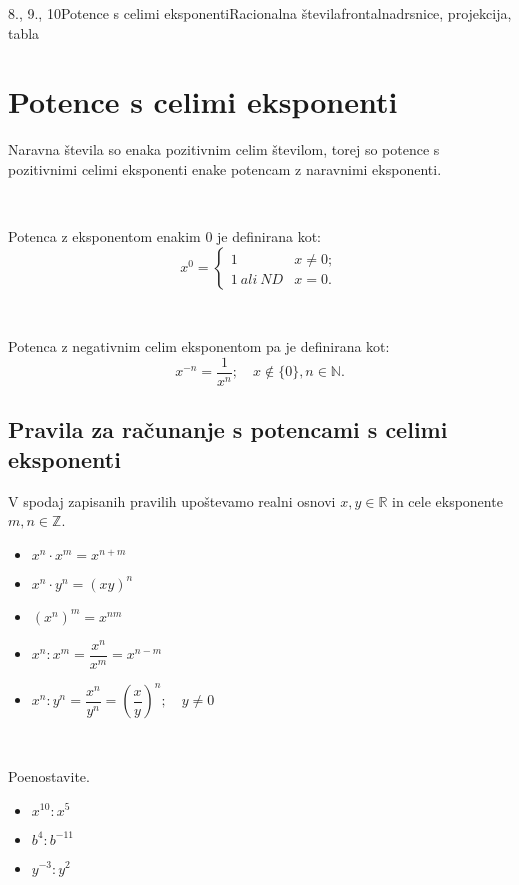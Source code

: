 \begin{priprava}{8., 9., 10}{}{Potence s celimi eksponenti}{Racionalna števila}{frontalna}{drsnice, projekcija, tabla}

    \section{Potence s celimi eksponenti}

            Naravna števila so enaka pozitivnim celim številom, torej so potence s pozitivnimi celimi eksponenti enake potencam z naravnimi eksponenti.

            ~

            Potenca z eksponentom enakim $0$ je definirana kot: 
            $$x^0=\begin{cases}
                    1 &x\neq 0; \\
                    1 ~ali~ND &x=0.
                \end{cases}$$

            ~

            Potenca z negativnim celim eksponentom pa je definirana kot:
            $$x^{-n}=\dfrac{1}{x^n}; \quad x\notin\{0\}, n\in\mathbb{N}.$$

            
        \subsection*{Pravila za računanje s potencami s celimi eksponenti}
            V spodaj zapisanih pravilih upoštevamo realni osnovi $x,y\in\mathbb{R}$ in cele eksponente $m,n\in\mathbb{Z}$.
            \begin{itemize}
                \item $x^n\cdot x^m=x^{n+m}$
                \item $x^n\cdot y^n=(xy)^n$
                \item $\left(x^n\right)^m=x^{nm}$
                \item $x^n:x^m=\dfrac{x^n}{x^m}=x^{n-m}$
                \item $x^n:y^n=\dfrac{x^n}{y^n}=\left(\dfrac{x}{y}\right)^n; \quad y\neq 0$
            \end{itemize}


    ~\\
            \begin{naloga}
                Poenostavite.
                \begin{itemize}
                    \item $x^{10}:x^5$ 
                    \item $b^4:b^{-11}$ 
                    \item $y^{-3}:y^2$ 
                \end{itemize}
            \end{naloga}


\end{priprava}
